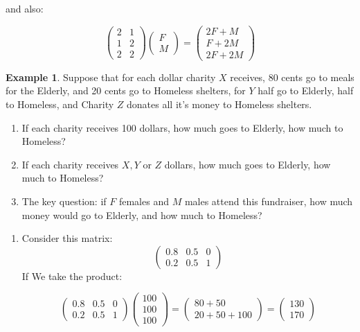\documentclass[10pt]{article}
\theoremstyle{definition}
\newtheorem{example}[equation]{Example}
\begin{document}
and also:

$$\begin{pmatrix} 2 & 1 \\ 1 & 2 \\ 2 & 2\end{pmatrix}\begin{pmatrix} F \\ M\end{pmatrix}=\begin{pmatrix} 2F+M \\ F+2M\\ 2F+2M\end{pmatrix}$$

\begin{example}
Suppose that for each dollar charity $X$ receives, 80 cents go to meals for the Elderly, and 20 cents go to Homeless shelters, for $Y$ half go to Elderly, half to Homeless, and Charity $Z$ donates all it's money to Homeless shelters.
\begin{enumerate}
\item If each charity receives 100 dollars, how much goes to Elderly, how much to Homeless?
\item If each charity receives $X, Y$ or $Z$ dollars, how much goes to Elderly, how much to Homeless?
\item The key question: if $F$ females and $M$ males attend this fundraiser, how much money would go to Elderly, and how much to Homeless?
\end{enumerate}


\begin{enumerate}
\item Consider this matrix: $$\begin{pmatrix} 0.8 & 0.5 & 0 \\ 0.2 & 0.5 & 1 \end{pmatrix}$$  If We take the product:

$$\begin{pmatrix} 0.8 & 0.5 & 0 \\ 0.2 & 0.5 & 1 \end{pmatrix}\begin{pmatrix} 100 \\ 100 \\ 100\end{pmatrix}=\begin{pmatrix} 80+50 \\ 20+50+100\end{pmatrix}=\begin{pmatrix} 130 \\ 170\end{pmatrix}$$


\end{enumerate}
\end{example}
\end{document}
